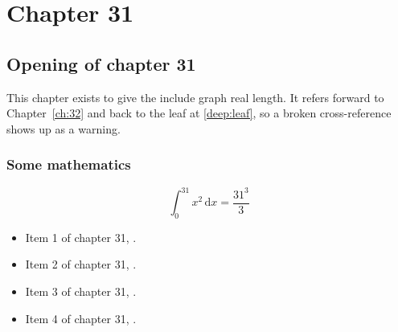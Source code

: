 \chapter{Chapter 31}
\label{ch:31}
\section{Opening of chapter 31}
This chapter exists to give the include graph real length. It refers
forward to Chapter~\ref{ch:32} and back to the leaf
at \ref{deep:leaf}, so a broken cross-reference shows up as a warning.

\subsection{Some mathematics}
\begin{equation}
  \int_0^{31} x^{2} \, \mathrm{d}x = \frac{31^{3}}{3}
\end{equation}

\begin{itemize}
  \item Item 1 of chapter 31, .
  \item Item 2 of chapter 31, .
  \item Item 3 of chapter 31, .
  \item Item 4 of chapter 31, .
\end{itemize}
